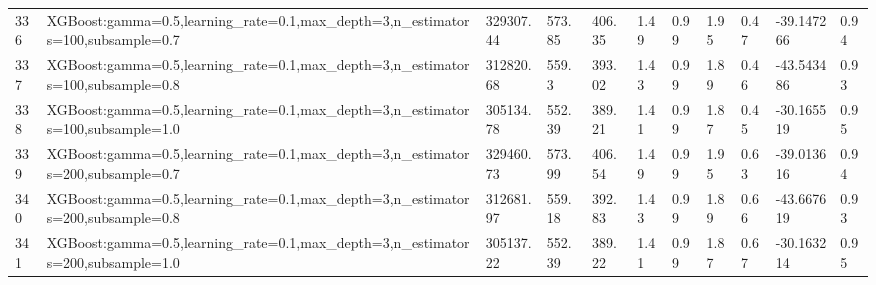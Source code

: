 \begin{longtable}{C{0.8cm} L{2cm} C{1.15cm} C{1.15cm} C{1.15cm} C{1.15cm} C{0.85cm} C{1.25cm} C{1.2cm} C{1.5cm} C{1.0cm}}
336 & XGBoost:\newline gamma=0.5,\newline learning\_rate=0.1,\newline max\_depth=3,\newline n\_estimators=100,\newline subsample=0.7 & 329307.44 & 573.85 & 406.35 & 1.49 & 0.99 & 1.95 & 0.47 & -39.147266 & 0.94 \\
337 & XGBoost:\newline gamma=0.5,\newline learning\_rate=0.1,\newline max\_depth=3,\newline n\_estimators=100,\newline subsample=0.8 & 312820.68 & 559.3 & 393.02 & 1.43 & 0.99 & 1.89 & 0.46 & -43.543486 & 0.93 \\
338 & XGBoost:\newline gamma=0.5,\newline learning\_rate=0.1,\newline max\_depth=3,\newline n\_estimators=100,\newline subsample=1.0 & 305134.78 & 552.39 & 389.21 & 1.41 & 0.99 & 1.87 & 0.45 & -30.165519 & 0.95 \\
339 & XGBoost:\newline gamma=0.5,\newline learning\_rate=0.1,\newline max\_depth=3,\newline n\_estimators=200,\newline subsample=0.7 & 329460.73 & 573.99 & 406.54 & 1.49 & 0.99 & 1.95 & 0.63 & -39.013616 & 0.94 \\
340 & XGBoost:\newline gamma=0.5,\newline learning\_rate=0.1,\newline max\_depth=3,\newline n\_estimators=200,\newline subsample=0.8 & 312681.97 & 559.18 & 392.83 & 1.43 & 0.99 & 1.89 & 0.66 & -43.667619 & 0.93 \\
341 & XGBoost:\newline gamma=0.5,\newline learning\_rate=0.1,\newline max\_depth=3,\newline n\_estimators=200,\newline subsample=1.0 & 305137.22 & 552.39 & 389.22 & 1.41 & 0.99 & 1.87 & 0.67 & -30.163214 & 0.95 \\

\end{longtable}

